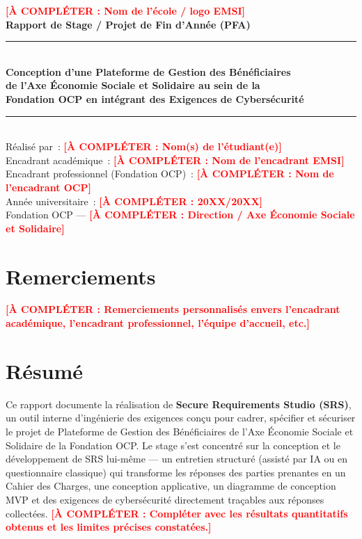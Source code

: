 \documentclass[a4paper,12pt]{report}
\newcommand{\TODO}[1]{\textcolor{red}{\textbf{[À COMPLÉTER : #1]}}}
\begin{document}
\begin{titlepage}
    \centering
    \vspace*{1cm}
    {\large \TODO{Nom de l'école / logo EMSI}}\\[1.5cm]
    {\Large \textbf{Rapport de Stage / Projet de Fin d'Année (PFA)}}\\[1cm]
    \rule{\linewidth}{0.5pt}\\[0.5cm]
    {\LARGE \textbf{Conception d'une Plateforme de Gestion des Bénéficiaires\\
    de l'Axe Économie Sociale et Solidaire au sein de la\\
    Fondation OCP en intégrant des Exigences de Cybersécurité}}\\[0.5cm]
    \rule{\linewidth}{0.5pt}\\[1.5cm]

    {\large Réalisé par~: \TODO{Nom(s) de l'étudiant(e)}}\\[0.5cm]
    {\large Encadrant académique~: \TODO{Nom de l'encadrant EMSI}}\\[0.3cm]
    {\large Encadrant professionnel (Fondation OCP)~: \TODO{Nom de l'encadrant OCP}}\\[1.5cm]

    {\large Année universitaire~: \TODO{20XX/20XX}}\\[2cm]

    \vfill
    {\large Fondation OCP — \TODO{Direction / Axe Économie Sociale et Solidaire}}
\end{titlepage}


\chapter*{Remerciements}
\TODO{Remerciements personnalisés envers l'encadrant académique, l'encadrant professionnel, l'équipe d'accueil, etc.}

\chapter*{Résumé}
Ce rapport documente la réalisation de \textbf{Secure Requirements Studio (SRS)}, un outil interne
d'ingénierie des exigences conçu pour cadrer, spécifier et sécuriser le projet de
Plateforme de Gestion des Bénéficiaires de l'Axe Économie Sociale et Solidaire de la
Fondation OCP. Le stage s'est concentré sur la conception et le développement de SRS
lui-même — un entretien structuré (assisté par IA ou en questionnaire classique) qui
transforme les réponses des parties prenantes en un Cahier des Charges, une conception
applicative, un diagramme de conception MVP et des exigences de cybersécurité
directement traçables aux réponses collectées. \TODO{Compléter avec les résultats
quantitatifs obtenus et les limites précises constatées.}
\end{document}
